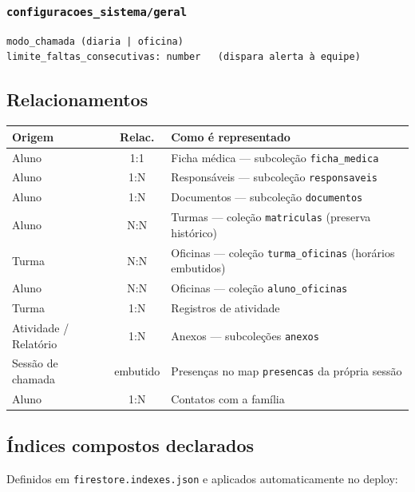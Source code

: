 \documentclass[a4paper,11pt]{article}
\begin{document}
\subsubsection*{\texttt{configuracoes\_sistema/geral}}

\begin{verbatim}
modo_chamada (diaria | oficina)
limite_faltas_consecutivas: number   (dispara alerta à equipe)
\end{verbatim}

\subsection{Relacionamentos}

\begin{center}
\begin{tabularx}{\textwidth}{l c X}
\toprule
\textbf{Origem} & \textbf{Relac.} & \textbf{Como é representado} \\
\midrule
Aluno & 1:1 & Ficha médica --- subcoleção \texttt{ficha\_medica} \\
Aluno & 1:N & Responsáveis --- subcoleção \texttt{responsaveis} \\
Aluno & 1:N & Documentos --- subcoleção \texttt{documentos} \\
Aluno & N:N & Turmas --- coleção \texttt{matriculas} (preserva histórico) \\
Turma & N:N & Oficinas --- coleção \texttt{turma\_oficinas} (horários embutidos) \\
Aluno & N:N & Oficinas --- coleção \texttt{aluno\_oficinas} \\
Turma & 1:N & Registros de atividade \\
Atividade / Relatório & 1:N & Anexos --- subcoleções \texttt{anexos} \\
Sessão de chamada & embutido & Presenças no map \texttt{presencas} da própria sessão \\
Aluno & 1:N & Contatos com a família \\
\bottomrule
\end{tabularx}
\end{center}

\subsection{Índices compostos declarados}

Definidos em \texttt{firestore.indexes.json} e aplicados automaticamente no deploy:
\end{document}
